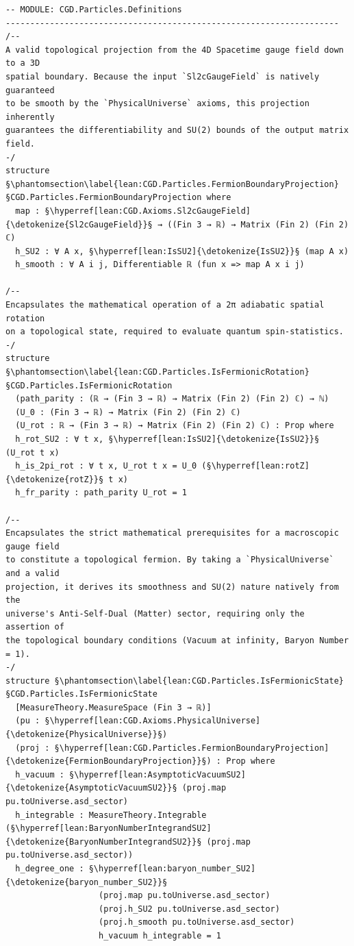 \begin{verbatim}
-- MODULE: CGD.Particles.Definitions
--------------------------------------------------------------------
/--
A valid topological projection from the 4D Spacetime gauge field down to a 3D 
spatial boundary. Because the input `Sl2cGaugeField` is natively guaranteed 
to be smooth by the `PhysicalUniverse` axioms, this projection inherently 
guarantees the differentiability and SU(2) bounds of the output matrix field.
-/
structure §\phantomsection\label{lean:CGD.Particles.FermionBoundaryProjection}§CGD.Particles.FermionBoundaryProjection where
  map : §\hyperref[lean:CGD.Axioms.Sl2cGaugeField]{\detokenize{Sl2cGaugeField}}§ → ((Fin 3 → ℝ) → Matrix (Fin 2) (Fin 2) ℂ)
  h_SU2 : ∀ A x, §\hyperref[lean:IsSU2]{\detokenize{IsSU2}}§ (map A x)
  h_smooth : ∀ A i j, Differentiable ℝ (fun x => map A x i j)

/--
Encapsulates the mathematical operation of a 2π adiabatic spatial rotation 
on a topological state, required to evaluate quantum spin-statistics.
-/
structure §\phantomsection\label{lean:CGD.Particles.IsFermionicRotation}§CGD.Particles.IsFermionicRotation
  (path_parity : (ℝ → (Fin 3 → ℝ) → Matrix (Fin 2) (Fin 2) ℂ) → ℕ)
  (U_0 : (Fin 3 → ℝ) → Matrix (Fin 2) (Fin 2) ℂ)
  (U_rot : ℝ → (Fin 3 → ℝ) → Matrix (Fin 2) (Fin 2) ℂ) : Prop where
  h_rot_SU2 : ∀ t x, §\hyperref[lean:IsSU2]{\detokenize{IsSU2}}§ (U_rot t x)
  h_is_2pi_rot : ∀ t x, U_rot t x = U_0 (§\hyperref[lean:rotZ]{\detokenize{rotZ}}§ t x)
  h_fr_parity : path_parity U_rot = 1

/--
Encapsulates the strict mathematical prerequisites for a macroscopic gauge field 
to constitute a topological fermion. By taking a `PhysicalUniverse` and a valid 
projection, it derives its smoothness and SU(2) nature natively from the 
universe's Anti-Self-Dual (Matter) sector, requiring only the assertion of 
the topological boundary conditions (Vacuum at infinity, Baryon Number = 1).
-/
structure §\phantomsection\label{lean:CGD.Particles.IsFermionicState}§CGD.Particles.IsFermionicState
  [MeasureTheory.MeasureSpace (Fin 3 → ℝ)]
  (pu : §\hyperref[lean:CGD.Axioms.PhysicalUniverse]{\detokenize{PhysicalUniverse}}§)
  (proj : §\hyperref[lean:CGD.Particles.FermionBoundaryProjection]{\detokenize{FermionBoundaryProjection}}§) : Prop where
  h_vacuum : §\hyperref[lean:AsymptoticVacuumSU2]{\detokenize{AsymptoticVacuumSU2}}§ (proj.map pu.toUniverse.asd_sector)
  h_integrable : MeasureTheory.Integrable (§\hyperref[lean:BaryonNumberIntegrandSU2]{\detokenize{BaryonNumberIntegrandSU2}}§ (proj.map pu.toUniverse.asd_sector))
  h_degree_one : §\hyperref[lean:baryon_number_SU2]{\detokenize{baryon_number_SU2}}§ 
                   (proj.map pu.toUniverse.asd_sector) 
                   (proj.h_SU2 pu.toUniverse.asd_sector) 
                   (proj.h_smooth pu.toUniverse.asd_sector) 
                   h_vacuum h_integrable = 1


\end{verbatim}
